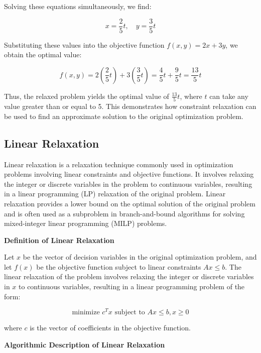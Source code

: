 \documentclass[12pt]{book} %
\begin{document}
Solving these equations simultaneously, we find:

\[
x = \frac{2}{5}t, \quad y = \frac{3}{5}t
\]

Substituting these values into the objective function \(f(x, y) = 2x + 3y\), we obtain the optimal value:

\[
f(x, y) = 2\left(\frac{2}{5}t\right) + 3\left(\frac{3}{5}t\right) = \frac{4}{5}t + \frac{9}{5}t = \frac{13}{5}t
\]

Thus, the relaxed problem yields the optimal value of \(\frac{13}{5}t\), where \(t\) can take any value greater than or equal to 5. This demonstrates how constraint relaxation can be used to find an approximate solution to the original optimization problem.

\subsection{Linear Relaxation}

Linear relaxation is a relaxation technique commonly used in optimization problems involving linear constraints and objective functions. It involves relaxing the integer or discrete variables in the problem to continuous variables, resulting in a linear programming (LP) relaxation of the original problem. Linear relaxation provides a lower bound on the optimal solution of the original problem and is often used as a subproblem in branch-and-bound algorithms for solving mixed-integer linear programming (MILP) problems.

\textbf{Definition of Linear Relaxation}

Let \(x\) be the vector of decision variables in the original optimization problem, and let \(f(x)\) be the objective function subject to linear constraints \(Ax \leq b\). The linear relaxation of the problem involves relaxing the integer or discrete variables in \(x\) to continuous variables, resulting in a linear programming problem of the form:

\[
\text{minimize } c^Tx \text{ subject to } Ax \leq b, x \geq 0
\]

where \(c\) is the vector of coefficients in the objective function.

\textbf{Algorithmic Description of Linear Relaxation}
\end{document}
